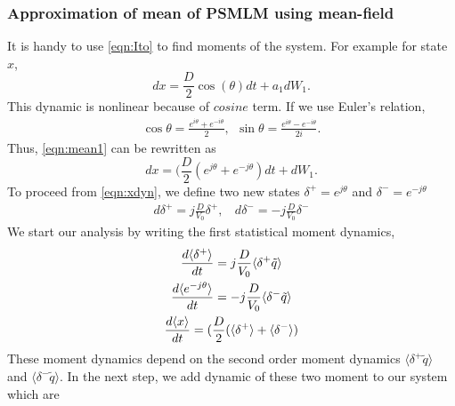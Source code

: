 \documentclass[letterpaper, 10 pt, conference]{ieeeconf}  %
\begin{document}
\subsubsection{Approximation of mean of PSMLM using mean-field}
It is handy to use \eqref{eqn:Ito} to find moments of the system. For example for state $x$,
\begin{equation}
dx=\frac{D}{2}\cos{(\theta)}dt + a_1 d{W_1}.
\label{eqn:mean1}
\end{equation}
This dynamic is nonlinear because of $cosine$ term. If we use Euler's relation, 
\begin{gather}
\cos{\theta}=\frac{e^{i \theta}+e^{-i \theta}}{2}, 
\ \
\sin{\theta}=\frac{e^{i \theta}-e^{-i \theta}}{2 i}.
\end{gather}
Thus, \eqref{eqn:mean1} can be rewritten as
\begin{equation}
dx=(\frac{D}{2}(e^{j \theta}+e^{-j \theta})dt + d{W_1}.
\label{eqn:xdyn}
\end{equation}
To proceed from \eqref{eqn:xdyn}, we define two new states $\delta^+=e^{j \theta}$ and $\delta^-=e^{-j \theta}$
\begin{gather}
d\delta^+=j \frac{D}{V_0} \delta^+,  \ \ \ \ 
d\delta^-=-j \frac{D}{V_0} \delta^-
\label{eqn:e2}
\end{gather}
We start our analysis by writing the first statistical moment dynamics,
\begin{gather}\small
	\frac{d\langle \delta^+ \rangle }{dt}=j 				\frac{D}{V_0} \langle \delta^+ \tilde{q} 				\rangle  \label{eqn:ei}\\ 
	\frac{d\langle e^{-j \theta}\rangle }{dt}=-j			\frac{D}{V_0} \langle \delta^- \tilde{q} 				\rangle \label{eqn:-ei}\\
	\frac{d \langle x \rangle}{dt}=(\frac{D}{2}( 			\langle \delta^+ \rangle + \langle \delta^- \rangle ) \label{eqn:xcor}
\end{gather}
These moment dynamics depend on the second order moment dynamics $\langle \delta^+ \tilde{q} \rangle$ and $\langle \delta^- \tilde{q} \rangle$. In the next step, we add dynamic of these two moment to our system which are
\end{document}
